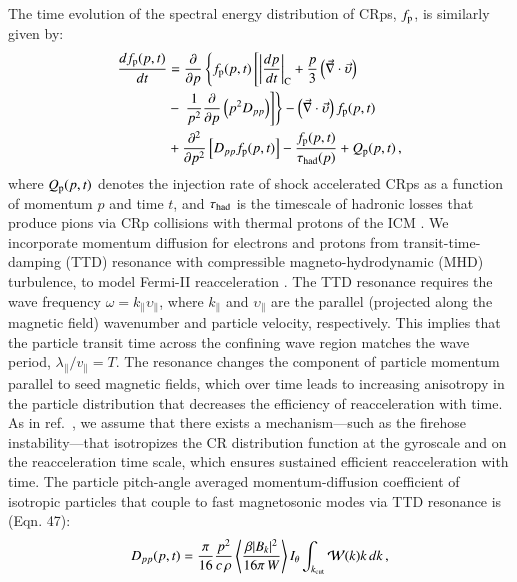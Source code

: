 \documentclass[useAMS,usenatbib]{mn2e}
\begin{document}
The time evolution of the spectral energy distribution of CRps,
$f_{{\mathrm{p}}}$, is similarly given by:
\begin{eqnarray}
{{d f_{{\mathrm{p}}}(p,t)}\over{d t}} &=
{{\partial }\over{\partial p}}
\left\{
f_{{\mathrm{p}}}(p,t)\left[ \left|{{dp}\over{dt}}\right|_{\rm C}
+ \frac{p}{3}\left(\vec{\nabla}\cdot \vec{\upsilon}\right)\right.\right.
\nonumber\\
&-\left.\left. {1\over{p^2}}{{\partial }\over{\partial p}}\left(p^2 D_{pp}\right)
\right]\right\} - \left(\vec{\nabla}\cdot \vec{\upsilon}\right) f_{{\mathrm{p}}}(p,t)
\nonumber\\
&+ {{\partial^2 }\over{\partial p^2}}
\left[ D_{pp} f_{{\mathrm{p}}}(p,t) \right] - {{f_{{\mathrm{p}}}(p,t)}\over{\tau_{\rm had}(p)}}
+ Q_{{\mathrm{p}}}(p,t)\, ,
\label{eq:FP_p}
\end{eqnarray}
where $Q_{{\mathrm{p}}}(p,t)$ denotes the injection rate of shock
accelerated CRps as a function of momentum $p$ and time $t$, and
$\tau_{\rm had}$ is the timescale of hadronic losses that produce
pions via CRp collisions with thermal protons of the ICM
\cite[e.g.][]{brunetti11}.  We incorporate momentum diffusion for
electrons and protons from transit-time-damping (TTD) resonance with
compressible magneto-hydrodynamic (MHD) turbulence, to model Fermi-II
reacceleration \citep{brunetti07,brunetti11}. The TTD resonance
requires the wave frequency $\omega=k_\parallel\upsilon_\parallel$,
where $k_\parallel$ and $\upsilon_\parallel$ are the parallel
(projected along the magnetic field) wavenumber and particle velocity,
respectively. This implies that the particle transit time across the
confining wave region matches the wave period,
$\lambda_{\parallel}/v_{\parallel}=T$. The resonance changes the
component of particle momentum parallel to seed magnetic fields, which
over time leads to increasing anisotropy in the particle distribution
that decreases the efficiency of reacceleration with time. As in
ref.{\ }\cite{brunetti11}, we assume that there exists a
mechanism---such as the firehose instability---that isotropizes the CR
distribution function at the gyroscale and on the reacceleration time
scale, which ensures sustained efficient reacceleration with time. The
particle pitch-angle averaged momentum-diffusion coefficient of
isotropic particles that couple to fast magnetosonic modes via TTD
resonance is \cite{brunetti07} (Eqn. 47):
\begin{eqnarray}
  D_{pp}(p,t) = \frac{\pi}{16} \frac{p^2}{c\,\rho}
  \left\langle\frac{\beta |B_k|^2}{16 \pi \,W}\right\rangle
  I_\theta
  \int_{k_{\mathrm{cut}}}\mathcal{W}(k)k\,d k\,,
\label{eq:dpp}
\end{eqnarray}
\end{document}
